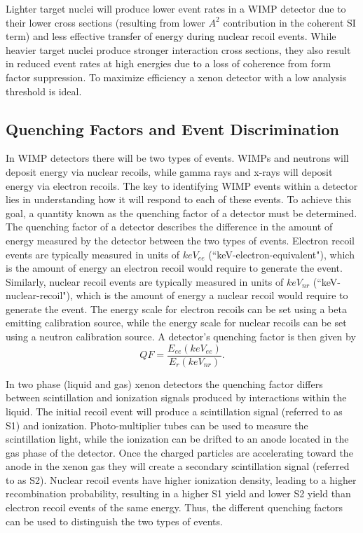 \documentclass[a4paper,12pt]{article}
\begin{document}
Lighter target nuclei will produce lower event rates in a WIMP detector due to their lower cross sections (resulting from lower $A^2$ contribution in the coherent SI term) and less effective transfer of energy during nuclear recoil events. While heavier target nuclei produce stronger interaction cross sections, they also result in reduced event rates at high energies due to a loss of coherence from form factor suppression.  To maximize efficiency a xenon detector with a low analysis threshold is ideal.

\subsection{Quenching Factors and Event Discrimination}
In WIMP detectors there will be two types of events.  WIMPs and neutrons will deposit energy via nuclear recoils, while gamma rays and x-rays will deposit energy via electron recoils.  The key to identifying WIMP events within a detector lies in understanding how it will respond to each of these events.  To achieve this goal, a quantity known as the quenching factor of a detector must be determined.  The quenching factor of a detector describes the difference in the amount of energy measured by the detector between the two types of events.  Electron recoil events are typically measured in units of $keV_{ee}$ (``keV-electron-equivalent"), which is the amount of energy an electron recoil would require to generate the event.  Similarly, nuclear recoil events are typically measured in units of $keV_{nr}$ (``keV-nuclear-recoil"), which is the amount of energy a nuclear recoil would require to generate the event.  The energy scale for electron recoils can be set using a beta emitting calibration source, while the energy scale for nuclear recoils can be set using a neutron calibration source.  A detector's quenching factor is then given by
\[QF=\frac{E_{ee}(keV_{ee})}{E_r(keV_{nr})}.\]

In two phase (liquid and gas) xenon detectors the quenching factor differs between scintillation and ionization signals produced by interactions within the liquid.  The initial recoil event will produce a scintillation signal (referred to as S1) and ionization.  Photo-multiplier tubes can be used to measure the scintillation light, while the ionization can be drifted to an anode located in the gas phase of the detector.  Once the charged particles are accelerating toward the anode in the xenon gas they will create a secondary scintillation signal (referred to as S2).  Nuclear recoil events have higher ionization density, leading to a higher recombination probability, resulting in a higher S1 yield and lower S2 yield than electron recoil events of the same energy. Thus, the different quenching factors can be used to distinguish the two types of events.
\end{document}
